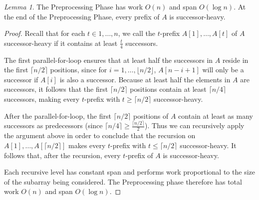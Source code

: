 \documentclass[twocolumn,10pt]{article}
\theoremstyle{remark}
\newtheorem{lemma}[thm]{Lemma}
\theoremstyle{remark}
\begin{document}
\begin{lemma}
 The Preprocessing Phase has work $O(n)$ and span $O(\log n)$. At the
 end of the Preprocessing Phase, every prefix of $A$ is
 successor-heavy.
  \label{lem:preprocessingphase}
\end{lemma}
\begin{proof}
Recall that for each $t \in 1, \ldots, n$, we call the $t$-prefix
$A[1], \ldots, A[t]$ of $A$ successor-heavy if it contains at least
$\frac{t}{4}$ successors.

The first parallel-for-loop ensures that at least half the successors
in $A$ reside in the first $\lceil n / 2 \rceil$ positions, since for
$i = 1, \ldots, \lfloor n / 2 \rfloor$, $A[n - i + 1]$ will only be a
successor if $A[i]$ is also a successor. Because at least half the
elements in $A$ are successors, it follows that the first $\lceil n /
2 \rceil$ positions contain at least $\lceil n / 4\rceil$ successors,
making every $t$-prefix with $t \ge \lceil n / 2 \rceil$
successor-heavy.

After the parallel-for-loop, the first $\lceil n / 2 \rceil$ positions
of $A$ contain at least as many successors as predecessors (since
$\lceil n / 4 \rceil \ge \frac{\lceil n / 2 \rceil}{2}$). Thus we can
recursively apply the argument above in order to conclude that the
recursion on $A[1], \ldots, A[\lceil n / 2 \rceil]$ makes every
$t$-prefix with $t \le \lceil n / 2 \rceil$ successor-heavy. It
follows that, after the recursion, every $t$-prefix of $A$ is
successor-heavy.

Each recursive level has constant span and performs work proportional
to the size of the subarray being considered. The Preprocessing phase
therefore has total work $O(n)$ and span $O(\log n)$.
\end{proof}




\end{document}
